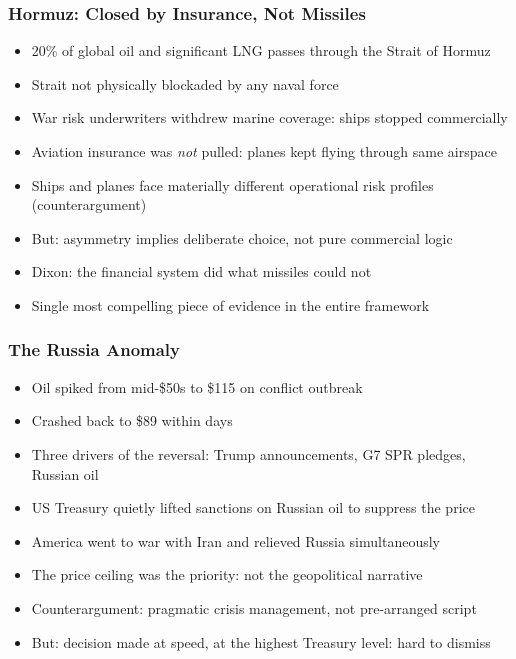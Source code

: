 \begin{frame}[fragile]\frametitle{Hormuz: Closed by Insurance, Not Missiles}
  \begin{itemize}
    \item 20\% of global oil and significant LNG passes through the Strait of Hormuz
    \item Strait not physically blockaded by any naval force
    \item War risk underwriters withdrew marine coverage: ships stopped commercially
    \item Aviation insurance was \emph{not} pulled: planes kept flying through same airspace
    \item Ships and planes face materially different operational risk profiles (counterargument)
    \item But: asymmetry implies deliberate choice, not pure commercial logic
    \item Dixon: the financial system did what missiles could not
    \item Single most compelling piece of evidence in the entire framework
  \end{itemize}
\end{frame}

\begin{frame}[fragile]\frametitle{The Russia Anomaly}
  \begin{itemize}
    \item Oil spiked from mid-\$50s to \$115 on conflict outbreak
    \item Crashed back to \$89 within days
    \item Three drivers of the reversal: Trump announcements, G7 SPR pledges, Russian oil
    \item US Treasury \alert{quietly lifted sanctions on Russian oil} to suppress the price
    \item America went to war with Iran and relieved Russia simultaneously
    \item The price ceiling was the priority: not the geopolitical narrative
    \item Counterargument: pragmatic crisis management, not pre-arranged script
    \item But: decision made at speed, at the highest Treasury level: hard to dismiss
  \end{itemize}
\end{frame}

